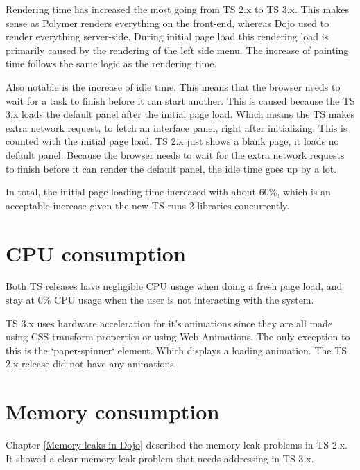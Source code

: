 Rendering time has increased the most going from TS 2.x to TS 3.x. This makes
sense as Polymer renders everything on the front-end, whereas Dojo used to render
everything server-side.
During initial page load this rendering load is primarily caused by the rendering
of the left side menu.
The increase of painting time follows the same logic as the rendering time.

Also notable is the increase of idle time. This means that the browser needs to
wait for a task to finish before it can start another.
This is caused because the TS 3.x loads the default panel after the initial page
load. Which means the TS makes extra network request, to fetch an interface panel,
right after initializing. This is counted with the initial page load.
TS 2.x just shows a blank page, it loads no default panel.
Because the browser needs to wait for the extra network requests to finish before
it can render the default panel, the idle time goes up by a lot.

In total, the initial page loading time increased with about 60\%, which is an
acceptable increase given the new TS runs 2 libraries concurrently.

\section{CPU consumption}
Both TS releases have negligible CPU usage when doing a fresh page load, and
stay at 0\% CPU usage when the user is not interacting with the system.

TS 3.x uses hardware acceleration for it's animations since they are all made
using CSS transform properties or using Web Animations\cite{webanimations}.
The only exception to this is the `paper-spinner` element. Which displays a
loading animation.
The TS 2.x release did not have any animations.


\section{Memory consumption}
Chapter \ref{Memory leaks in Dojo} described the memory leak problems in TS 2.x.
It showed a clear memory leak problem that needs addressing in TS 3.x.

